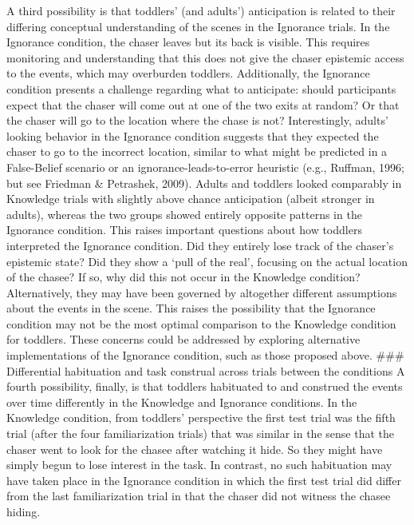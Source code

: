 \documentclass[
  man,floatsintext]{apa6}
\begin{document}
A third possibility is that toddlers' (and adults') anticipation is related to their differing conceptual understanding of the scenes in the Ignorance trials. In the Ignorance condition, the chaser leaves but its back is visible. This requires monitoring and understanding that this does not give the chaser epistemic access to the events, which may overburden toddlers. Additionally, the Ignorance condition presents a challenge regarding what to anticipate: should participants expect that the chaser will come out at one of the two exits at random? Or that the chaser will go to the location where the chase is not? Interestingly, adults' looking behavior in the Ignorance condition suggests that they expected the chaser to go to the incorrect location, similar to what might be predicted in a False-Belief scenario or an ignorance-leads-to-error heuristic (e.g., Ruffman, 1996; but see Friedman \& Petrashek, 2009). Adults and toddlers looked comparably in Knowledge trials with slightly above chance anticipation (albeit stronger in adults), whereas the two groups showed entirely opposite patterns in the Ignorance condition. This raises important questions about how toddlers interpreted the Ignorance condition. Did they entirely lose track of the chaser's epistemic state? Did they show a `pull of the real', focusing on the actual location of the chasee? If so, why did this not occur in the Knowledge condition? Alternatively, they may have been governed by altogether different assumptions about the events in the scene. This raises the possibility that the Ignorance condition may not be the most optimal comparison to the Knowledge condition for toddlers. These concerns could be addressed by exploring alternative implementations of the Ignorance condition, such as those proposed above.
\#\#\# Differential habituation and task construal across trials between the conditions
A fourth possibility, finally, is that toddlers habituated to and construed the events over time differently in the Knowledge and Ignorance conditions. In the Knowledge condition, from toddlers' perspective the first test trial was the fifth trial (after the four familiarization trials) that was similar in the sense that the chaser went to look for the chasee after watching it hide. So they might have simply begun to lose interest in the task. In contrast, no such habituation may have taken place in the Ignorance condition in which the first test trial did differ from the last familiarization trial in that the chaser did not witness the chasee hiding.
\end{document}
